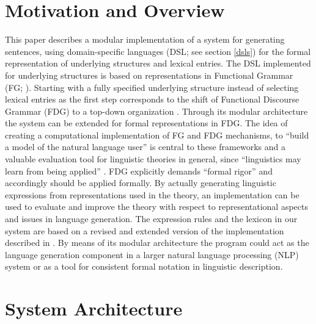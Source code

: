 \documentclass[a4paper, halfparskip, onecolumn, abstractoff, final]{scrartcl}
\begin{document}



\section{Motivation and Overview}
This paper describes a modular implementation of a system for generating sentences, using domain-specific languages (DSL; see section \ref{dsls}) for the formal representation of underlying structures and lexical entries. The DSL implemented for underlying structures is based on representations in Functional Grammar (FG; \citealt{Dik1997a}). Starting with a fully specified underlying structure instead of selecting lexical entries as the first step corresponds to the shift of Functional Discourse Grammar (FDG) to a top-down organization \citep[668]{HengeveldAndMackenzie2006}. Through its modular architecture the system can be extended for formal representations in FDG. The idea of creating a computational implementation of FG and FDG mechanisms, to ``build a model of the natural language user'' \citep[1]{Dik1997a} is central to these frameworks and a valuable evaluation tool for linguistic theories in general, since ``linguistics may learn from being applied'' \citep[4]{Bakker1994}. FDG explicitly demands ``formal rigor'' \citep[668]{HengeveldAndMackenzie2006} and accordingly should be applied formally. By actually generating linguistic expressions from representations used in the theory, an implementation can be used to evaluate and improve the theory with respect to representational aspects and issues in language generation. The expression rules and the lexicon in our system are based on a revised and extended version of the implementation described in \cite{Samuelsdorff1989}. By means of its modular architecture the program could act as the language generation component in a larger natural language processing (NLP) system or as a tool for consistent formal notation in linguistic description.

\section{System Architecture}
\end{document}
